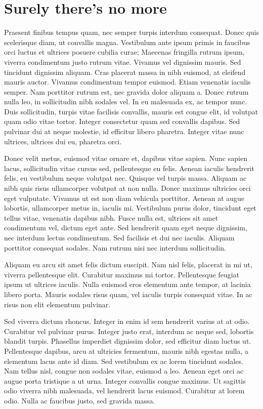 \documentclass{article}
\begin{document}
\section{Surely there's no more}

Praesent finibus tempus quam, nec semper turpis interdum consequat. Donec quis scelerisque diam, ut convallis magna. Vestibulum ante ipsum primis in faucibus orci luctus et ultrices posuere cubilia curae; Maecenas fringilla rutrum ipsum, viverra condimentum justo rutrum vitae. Vivamus vel dignissim mauris. Sed tincidunt dignissim aliquam. Cras placerat massa in nibh euismod, at eleifend mauris auctor. Vivamus condimentum tempor euismod. Etiam venenatis iaculis semper. Nam porttitor rutrum est, nec gravida dolor aliquam a. Donec rutrum nulla leo, in sollicitudin nibh sodales vel. In eu malesuada ex, ac tempor nunc. Duis sollicitudin, turpis vitae facilisis convallis, mauris est congue elit, id volutpat quam odio vitae tortor. Integer consectetur quam sed convallis dapibus. Sed pulvinar dui at neque molestie, id efficitur libero pharetra. Integer vitae nunc ultrices, ultrices dui eu, pharetra orci.

Donec velit metus, euismod vitae ornare et, dapibus vitae sapien. Nunc sapien lacus, sollicitudin vitae cursus sed, pellentesque eu felis. Aenean iaculis hendrerit felis, eu vestibulum neque volutpat nec. Quisque vel turpis massa. Aliquam ac nibh quis risus ullamcorper volutpat at non nulla. Donec maximus ultricies orci eget vulputate. Vivamus ut est non diam vehicula porttitor. Aenean at augue lobortis, ullamcorper metus in, iaculis mi. Vestibulum purus dolor, tincidunt eget tellus vitae, venenatis dapibus nibh. Fusce nulla est, ultrices sit amet condimentum vel, dictum eget ante. Sed hendrerit quam eget neque dignissim, nec interdum lectus condimentum. Sed facilisis et dui nec iaculis. Aliquam porttitor consequat sodales. Nam rutrum nisi nec interdum sollicitudin.

Aliquam eu arcu sit amet felis dictum suscipit. Nam nisl felis, placerat in mi ut, viverra pellentesque elit. Curabitur maximus mi tortor. Pellentesque feugiat ipsum ut ultrices iaculis. Nulla euismod eros elementum ante tempor, at lacinia libero porta. Mauris sodales risus quam, vel iaculis turpis consequat vitae. In ac risus non elit elementum pulvinar.

Sed viverra dictum rhoncus. Integer in enim id sem hendrerit varius at at odio. Curabitur vel pulvinar purus. Integer justo erat, interdum ac neque sed, lobortis blandit turpis. Phasellus imperdiet dignissim dolor, sed efficitur diam luctus ut. Pellentesque dapibus, arcu at ultricies fermentum, mauris nibh egestas nulla, a elementum lacus ante id diam. Sed vestibulum ex ac lorem tincidunt sodales. Nam tellus nisl, congue non sodales vitae, euismod a leo. Aenean eget orci ac augue porta tristique a ut urna. Integer convallis congue maximus. Ut sagittis odio viverra nibh malesuada, vel hendrerit lacus euismod. Curabitur at lorem odio. Nulla ac faucibus justo, sed gravida massa. 
\end{document}
